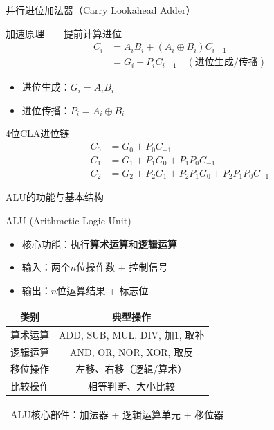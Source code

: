 \documentclass[10pt, aspectratio=169]{beamer}
\begin{document}
\begin{frame}{并行进位加法器（Carry Lookahead Adder）}
    \begin{block}{加速原理——提前计算进位}
        \begin{align*}
            C_i &= A_iB_i + (A_i \oplus B_i)C_{i-1} \\
                &= G_i + P_i C_{i-1} \quad (\text{进位生成/传播})
        \end{align*}
        \begin{itemize}
            \item 进位生成：$G_i = A_iB_i$
            \item 进位传播：$P_i = A_i \oplus B_i$
        \end{itemize}
    \end{block}
    \vspace{0.3em}
    \begin{exampleblock}{4位CLA进位链}
        \begin{align*}
            C_0 &= G_0 + P_0 C_{-1} \\
            C_1 &= G_1 + P_1 G_0 + P_1 P_0 C_{-1} \\
            C_2 &= G_2 + P_2 G_1 + P_2 P_1 G_0 + P_2 P_1 P_0 C_{-1}
        \end{align*}
    \end{exampleblock}
\end{frame}

\begin{frame}[t]{ALU的功能与基本结构}
    \begin{block}{ALU (Arithmetic Logic Unit)}
        \begin{itemize}
            \item 核心功能：执行\textbf{算术运算}和\textbf{逻辑运算}
            \item 输入：两个$n$位操作数 + 控制信号
            \item 输出：$n$位运算结果 + 标志位
        \end{itemize}
    \end{block}
    \vspace{0.3em}
    \begin{tabular}{|c|c|}
        \hline
        \textbf{类别} & \textbf{典型操作} \\
        \hline
        算术运算 & ADD, SUB, MUL, DIV, 加1, 取补 \\
        \hline
        逻辑运算 & AND, OR, NOR, XOR, 取反 \\
        \hline
        移位操作 & 左移、右移（逻辑/算术） \\
        \hline
        比较操作 & 相等判断、大小比较 \\
        \hline
    \end{tabular}
    \vspace{0.5em}
    \begin{center}
        \begin{tabular}{c}
            ALU核心部件：加法器 + 逻辑运算单元 + 移位器
        \end{tabular}
    \end{center}
\end{frame}
\end{document}
